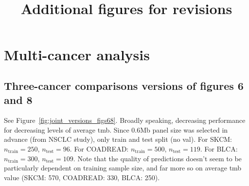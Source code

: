 \documentclass[12pt]{article}
\title{Additional figures for revisions}
\begin{document}
\section{Multi-cancer analysis}
\subsection{Three-cancer comparisons versions of figures 6 and 8}
See Figure~\ref{fig:joint_versions_figs68}. Broadly speaking, decreasing performance for decreasing levels of average \gls{tmb}. Since 0.6Mb panel size was selected in advance (from NSCLC study), only train and test split (no val). For SKCM: $n_{\text{train}} = 250$, $n_{\text{test}} = 96$. For COADREAD: $n_{\text{train}} = 500$, $n_{\text{test}} = 119$. For BLCA: $n_{\text{train}} = 300$, $n_{\text{test}} = 109$. Note that the quality of predictions doesn't seem to be particularly dependent on training sample size, and far more so on average \gls{tmb} value (SKCM: 570, COADREAD: 330, BLCA: 250).
\end{document}

